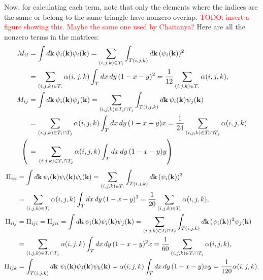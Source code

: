 \documentclass[12pt]{article}
\begin{document}
Now, for calculating each term, note that only the elements where the indices are the same or belong
to the same triangle have nonzero overlap. \textcolor{red}{TODO: insert a figure showing this. Maybe
the same one used by Chaitanya?} Here are all the nonzero terms in the matrices:
\begin{align}
M_{ii} &= \int\dd{\vb{k}}\psi_i(\vb{k})\psi_i(\vb{k})
    = \sum_{(i,j,k) \in T_i} \int_{T(i,j,k)} \dd{\vb{k}} (\psi_i(\vb{k}))^2 \\
    &= \sum_{(i,j,k) \in T_i} \alpha(i,j,k) \int_T \dd{x} \dd{y} (1 - x - y)^2
    = \frac{1}{12} \sum_{(i,j,k) \in T_i} \alpha(i,j,k), \notag \\
M_{ij} &= \int\dd{\vb{k}}\psi_i(\vb{k})\psi_j(\vb{k})
    = \sum_{(i,j,k) \in T_i \cap T_j} \int_{T(i,j,k)} \dd{\vb{k}} \psi_i(\vb{k}) \psi_j(\vb{k}) \\
    &= \sum_{(i,j,k) \in T_i \cap T_j} \alpha(i,j,k) \int_T \dd{x} \dd{y} (1 - x - y)x
    = \frac{1}{24} \sum_{(i,j,k) \in T_i \cap T_j} \alpha(i,j,k) \notag \\
    \left(\vphantom{\sum_{(i)}}\right. &=\left.\sum_{(i,j,k) \in T_i \cap T_j}
    \alpha(i,j,k) \int_T \dd{x} \dd{y} (1 - x - y)y \right) \notag
\end{align}
\begin{align}
\Pi_{iii} &= \int\dd{\vb{k}}\psi_i(\vb{k})\psi_i(\vb{k})\psi_i(\vb{k})
    = \sum_{(i,j,k) \in T_i} \int_{T(i,j,k)} \dd{\vb{k}} (\psi_i(\vb{k}))^3 \\
    &= \sum_{(i,j,k) \in T_i} \alpha(i,j,k) \int_T \dd{x} \dd{y} (1 - x - y)^3
    = \frac{1}{20} \sum_{(i,j,k) \in T_i} \alpha(i,j,k), \notag \\
\Pi_{iij} &= \Pi_{iji} = \Pi_{jii} = \int\dd{\vb{k}}\psi_i(\vb{k})\psi_i(\vb{k})\psi_j(\vb{k})
    = \sum_{(i,j,k) \in T_i \cap T_j} \int_{T(i,j,k)} \dd{\vb{k}}
        (\psi_i(\vb{k}))^2 \psi_j(\vb{k}) \\
    &= \sum_{(i,j,k) \in T_i \cap T_j} \alpha(i,j,k) \int_T \dd{x} \dd{y} (1 - x - y)^2 x
    = \frac{1}{60} \sum_{(i,j,k) \in T_i \cap T_j} \alpha(i,j,k), \notag\\
\Pi_{ijk} &= \int_{T(i,j,k)} \dd{\vb{k}}\, \psi_i(\vb{k}) \psi_j(\vb{k}) \psi_k(\vb{k})
= \alpha(i,j,k) \int_T \dd{x} \dd{y} (1 - x - y)xy = \frac{1}{120} \alpha(i,j,k).
\end{align}
\end{document}
